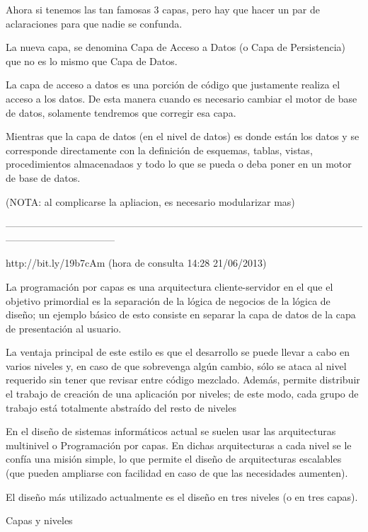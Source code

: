Ahora si tenemos las tan famosas 3 capas, pero hay que hacer un par de aclaraciones para que nadie se confunda.

La nueva capa, se denomina Capa de Acceso a Datos (o Capa de Persistencia) que no es lo mismo que Capa de Datos.

 

La capa de acceso a datos es una porción de código que justamente realiza el acceso a los datos. De esta manera cuando es necesario 
cambiar el motor de base de datos, solamente tendremos que corregir esa capa.

 

Mientras que la capa de datos (en el nivel de datos) es donde están los datos y se corresponde directamente con la definición de 
esquemas, tablas, vistas, procedimientos almacenadaos y todo lo que se pueda o deba poner en un motor de base de datos. 

(NOTA: al complicarse la apliacion, es necesario modularizar mas)

---------------------------------------------------------------------------------------------------------------------------------------------

http://bit.ly/19b7cAm (hora de consulta 14:28 21/06/2013)

La programación por capas es una arquitectura cliente-servidor en el que el objetivo primordial es la separación de la lógica de negocios de 
la lógica de diseño; un ejemplo básico de esto consiste en separar la capa de datos de la capa de presentación al usuario.

La ventaja principal de este estilo es que el desarrollo se puede llevar a cabo en varios niveles y, en caso de que sobrevenga algún 
cambio, sólo se ataca al nivel requerido sin tener que revisar entre código mezclado. 
Además, permite distribuir el trabajo de creación de una aplicación por niveles; de este modo, cada grupo de trabajo está totalmente 
abstraído del resto de niveles

En el diseño de sistemas informáticos actual se suelen usar las arquitecturas multinivel o Programación por capas. En dichas arquitecturas 
a cada nivel se le confía una misión simple, lo que permite el diseño de arquitecturas escalables (que pueden ampliarse con facilidad en 
caso de que las necesidades aumenten).

El diseño más utilizado actualmente es el diseño en tres niveles (o en tres capas).

Capas y niveles

